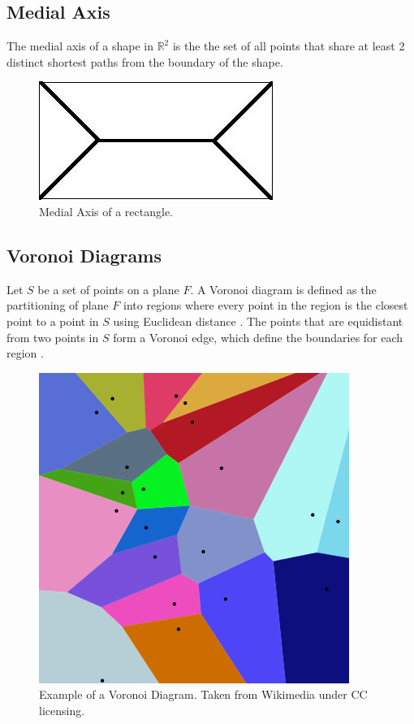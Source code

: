 \documentclass[12 pt]{article}
\begin{document}
\subsection*{Medial Axis}
The medial axis of a shape in $\mathbb{R}^2$ is the the set of all points that share at least 2 distinct shortest paths from the boundary of the shape.\cite{GFALOP:1}

\begin{figure}[h]
\caption{Medial Axis of a rectangle.\cite{MEDAX}}
\centering
\includegraphics[scale=0.45]{medax.jpg}
\end{figure}

\subsection*{Voronoi Diagrams}
	Let $S$ be a set of points on a plane $F$. A Voronoi diagram is defined as the partitioning of plane $F$ into regions where every point in the region is the closest point to a point in $S$ using Euclidean distance .\cite{GFALOP:1} The points that are equidistant from two points in $S$ form a Voronoi edge, which define the boundaries for each region .\cite{GFALOP:1}
\begin{figure}[h]
\caption{Example of a Voronoi Diagram. Taken from Wikimedia under CC licensing.}
\centering
\includegraphics[scale=0.5]{voronoi.png}
\end{figure}
\end{document}
